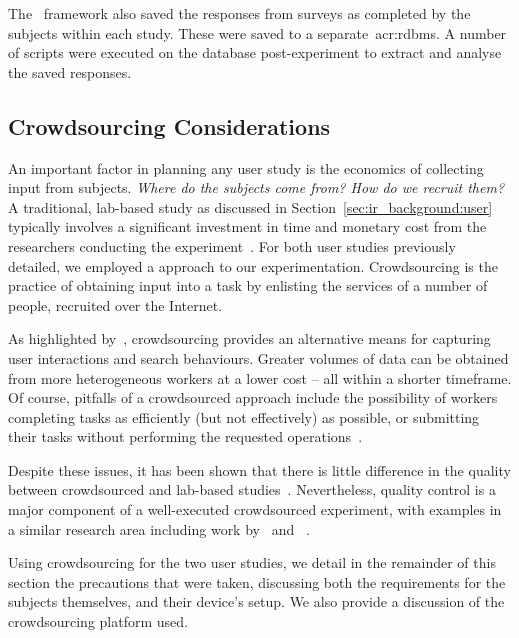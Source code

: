 The \treconomics~framework also saved the responses from surveys as completed by the subjects within each study. These were saved to a separate~\gls{acr:rdbms}. A number of scripts were executed on the database post-experiment to extract and analyse the saved responses.

\subsection{Crowdsourcing Considerations}\label{sec:methodology:user:crowdsourcing}
An important factor in planning any user study is the economics of collecting input from subjects. \emph{Where do the subjects come from? How do we recruit them?} A traditional, lab-based study as discussed in Section~\ref{sec:ir_background:user} typically involves a significant investment in time and monetary cost from the researchers conducting the experiment~\citep{spool2001testing}. For both user studies previously detailed, we employed a  approach to our experimentation. Crowdsourcing is the practice of obtaining input into a task by enlisting the services of a number of people, recruited over the Internet.

As highlighted by~\cite{zuccon2013crowdsourcing_comparisons}, crowdsourcing provides an alternative means for capturing user interactions and search behaviours. Greater volumes of data can be obtained from more heterogeneous workers at a lower cost -- all within a shorter timeframe. Of course, pitfalls of a crowdsourced approach include the possibility of workers completing tasks as efficiently (but not effectively) as possible, or submitting their tasks without performing the requested operations~\citep{feild2010turkers}.

Despite these issues, it has been shown that there is little difference in the quality between crowdsourced and lab-based studies~\citep{kely2011user_study, zuccon2013crowdsourcing_comparisons}. Nevertheless, quality control is a major component of a well-executed crowdsourced experiment, with examples in a similar research area including work by~\cite{kazai2011crowdsourced} and ~\cite{crescenzi2013crowdsourced}.

Using crowdsourcing for the two user studies, we detail in the remainder of this section the precautions that were taken, discussing both the requirements for the subjects themselves, and their device's setup. We also provide a discussion of the crowdsourcing platform used.

